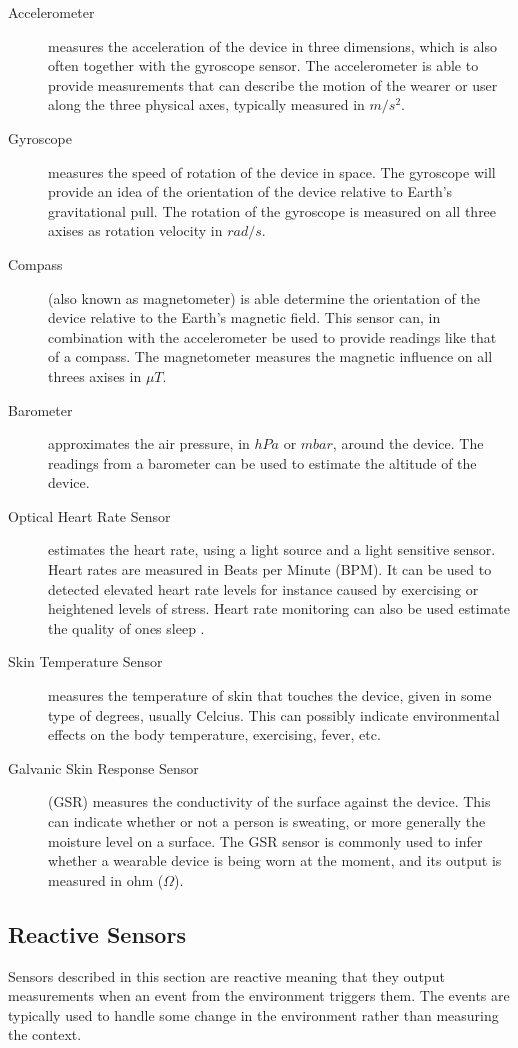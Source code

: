 \begin{description}
	\item[Accelerometer] measures the acceleration of the device in three dimensions, which is also often together with the gyroscope sensor. The accelerometer is able to provide measurements that can describe the motion of the wearer or user along the three physical axes, typically measured in $m/s^2$.
	\item[Gyroscope] measures the speed of rotation of the device in space. The gyroscope will provide an idea of the orientation of the device relative to Earth's gravitational pull. The rotation of the gyroscope is measured on all three axises as rotation velocity in $rad/s$.
	\item[Compass] (also known as magnetometer) is able determine the orientation of the device relative to the Earth's magnetic field. This sensor can, in combination with the accelerometer be used to provide readings like that of a compass. The magnetometer measures the magnetic influence on all threes axises in $\mu T$.
	\item[Barometer] approximates the air pressure, in $hPa$ or $mbar$, around the device. The readings from a barometer can be used to estimate the altitude of the device.
    \item[Optical Heart Rate Sensor] estimates the heart rate, using a light source and a light sensitive sensor. Heart rates are measured in Beats per Minute (BPM). It can be used to detected elevated heart rate levels for instance caused by exercising or heightened levels of stress. Heart rate monitoring can also be used estimate the quality of ones sleep \parencite{guardian_fitness_tracker_rem_sleep}. 
    \item[Skin Temperature Sensor] measures the temperature of skin that touches the device, given in some type of degrees, usually Celcius. This can possibly indicate environmental effects on the body temperature, exercising, fever, etc.
    \item[Galvanic Skin Response Sensor] (GSR) measures the conductivity of the surface against the device. This can indicate whether or not a person is sweating, or more generally the moisture level on a surface. The GSR sensor is commonly used to infer whether a wearable device is being worn at the moment, and its output is measured in ohm ($\Omega$).
\end{description}

\subsection{Reactive Sensors}
Sensors described in this section are reactive meaning that they output measurements when an event from the environment triggers them. The events are typically used to handle some change in the environment rather than measuring the context.

